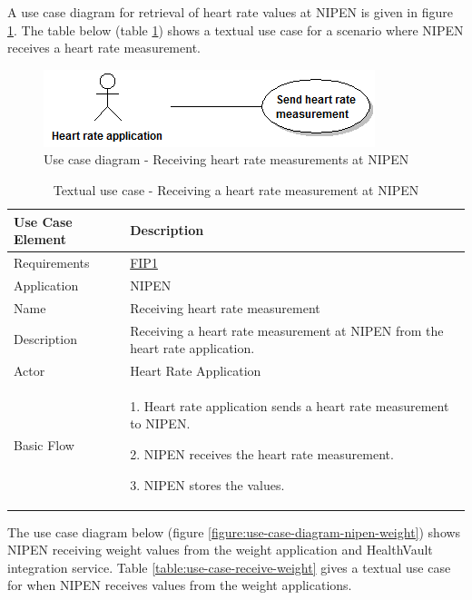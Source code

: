A use case diagram for retrieval of heart rate values at NIPEN is given in figure \ref{figure:use-case-diagram-nipen-heart-rate}.
The table below (table \ref{table:use-case-receive-heart-rate}) shows a textual use case for a scenario where NIPEN receives a heart rate measurement.

\begin{figure}[H]
\centering
\includegraphics[scale=0.6]{../Figures/use-case-diagram-nipen-heart-rate.png}
\caption{Use case diagram - Receiving heart rate measurements at NIPEN}
\label{figure:use-case-diagram-nipen-heart-rate}
\end{figure}

\begin{table}[H]
\begin{center}
\begin{tabular}{ l | p{10cm} }
  \hline
  \textbf{Use Case Element} & \textbf{Description} \\ \hline\hline
  Requirements & \hyperref[table:reqip]{FIP1} \\ \hline
  Application & NIPEN \\ \hline
  Name & Receiving heart rate measurement \\ \hline
  Description & Receiving a heart rate measurement at NIPEN from the heart rate application. \\ \hline
  Actor & Heart Rate Application \\ \hline
  Basic Flow & 
  	\par 1. Heart rate application sends a heart rate measurement to NIPEN.
  	\par 2. NIPEN receives the heart rate measurement.
  	\par 3. NIPEN stores the values.
  	\\ \hline
\end{tabular}
\end{center}
\caption{Textual use case - Receiving a heart rate measurement at NIPEN}
\label{table:use-case-receive-heart-rate}
\end{table}

The use case diagram below (figure \ref{figure:use-case-diagram-nipen-weight}) shows NIPEN receiving weight values from the weight application and HealthVault integration service.
Table \ref{table:use-case-receive-weight} gives a textual use case for when NIPEN receives values from the weight applications. 

